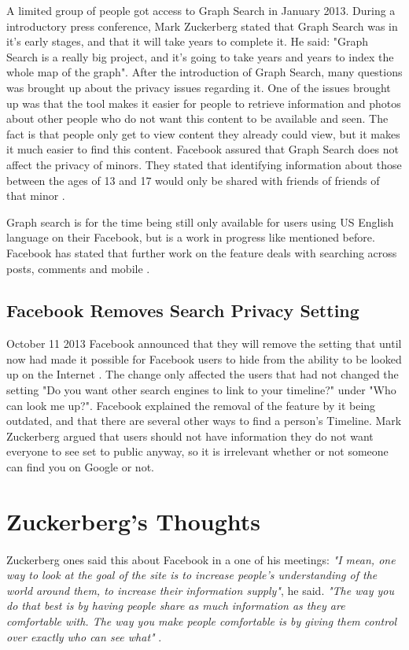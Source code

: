 A limited group of people got access to Graph Search in January 2013. During a introductory press conference, Mark Zuckerberg stated that Graph Search was in it's early stages, and that it will take years to complete it. He said: "Graph Search is a really big project, and it's going to take years and years to index the whole map of the graph". After the introduction of Graph Search, many questions was brought up about the privacy issues regarding it. One of the issues brought up was that the tool makes it easier for people to retrieve information and photos about other people who do not want this content to be available and seen. The fact is that people only get to view content they already could view, but it makes it much easier to find this content. Facebook  assured that Graph Search does not affect the privacy of minors. They stated that identifying information about those between the ages of 13 and 17 would only be shared with friends of friends of that minor \cite{graphsearchcw}. 

Graph search is for the time being still only available for users using US English language on their Facebook, but is a work in progress like mentioned before. Facebook has stated that further work on the feature deals with searching across posts, comments and mobile \cite{graphsearchcw}. 


\subsection{Facebook Removes Search Privacy Setting}
October 11 2013 Facebook announced that they will remove the setting that until now had made it possible for Facebook users to hide from the ability to be looked up on the Internet \cite{searchSetting}. The change only affected the users that had not changed the setting "Do you want other search engines to link to your timeline?" under "Who can look me up?". Facebook explained the removal of the feature by it being outdated, and that there are several other ways to find a person's Timeline. Mark Zuckerberg argued that users should not have information they do not want everyone to see set to public anyway, so it is irrelevant whether or not someone can find you on Google or not. 
 

\section{Zuckerberg's Thoughts}

\paragraph{}
Zuckerberg ones said this about Facebook in a one of his meetings: \textit{"I mean, one way to look at the goal of the site is to increase people’s understanding of the world around them, to increase their information supply"}, he said. \textit{"The way you do that best is by having people share as much information as they are comfortable with. The way you make people comfortable is by giving them control over exactly who can see what"} \cite{MeMedia}.

